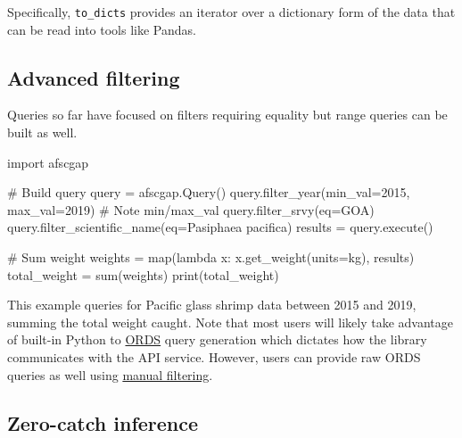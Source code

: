 \documentclass[
  letterpaper,
  oneside,
  open=any]{scrbook}
\newenvironment{Shaded}{\begin{snugshade}}{\end{snugshade}}
\newcommand{\AttributeTok}[1]{\textcolor[rgb]{0.40,0.45,0.13}{#1}}
\newcommand{\CommentTok}[1]{\textcolor[rgb]{0.37,0.37,0.37}{#1}}
\newcommand{\DecValTok}[1]{\textcolor[rgb]{0.68,0.00,0.00}{#1}}
\newcommand{\FunctionTok}[1]{\textcolor[rgb]{0.28,0.35,0.67}{#1}}
\newcommand{\NormalTok}[1]{\textcolor[rgb]{0.00,0.23,0.31}{#1}}
\newcommand{\OtherTok}[1]{\textcolor[rgb]{0.00,0.23,0.31}{#1}}
\newcommand{\SpecialCharTok}[1]{\textcolor[rgb]{0.37,0.37,0.37}{#1}}
\newcommand{\StringTok}[1]{\textcolor[rgb]{0.13,0.47,0.30}{#1}}
\begin{document}
Specifically, \texttt{to\_dicts} provides an iterator over a dictionary
form of the data that can be read into tools like Pandas.

\hypertarget{advanced-filtering}{%
\subsection{Advanced filtering}\label{advanced-filtering}}

Queries so far have focused on filters requiring equality but range
queries can be built as well.

\begin{Shaded}
\begin{Highlighting}[]
\NormalTok{import afscgap}

\CommentTok{\# Build query}
\NormalTok{query }\OtherTok{=} \FunctionTok{afscgap.Query}\NormalTok{()}
\FunctionTok{query.filter\_year}\NormalTok{(}\AttributeTok{min\_val=}\DecValTok{2015}\NormalTok{, }\AttributeTok{max\_val=}\DecValTok{2019}\NormalTok{)   }\CommentTok{\# Note min/max\_val}
\FunctionTok{query.filter\_srvy}\NormalTok{(}\AttributeTok{eq=}\StringTok{\textquotesingle{}GOA\textquotesingle{}}\NormalTok{)}
\FunctionTok{query.filter\_scientific\_name}\NormalTok{(}\AttributeTok{eq=}\StringTok{\textquotesingle{}Pasiphaea pacifica\textquotesingle{}}\NormalTok{)}
\NormalTok{results }\OtherTok{=} \FunctionTok{query.execute}\NormalTok{()}

\CommentTok{\# Sum weight}
\NormalTok{weights }\OtherTok{=} \FunctionTok{map}\NormalTok{(lambda x}\SpecialCharTok{:} \FunctionTok{x.get\_weight}\NormalTok{(}\AttributeTok{units=}\StringTok{\textquotesingle{}kg\textquotesingle{}}\NormalTok{), results)}
\NormalTok{total\_weight }\OtherTok{=} \FunctionTok{sum}\NormalTok{(weights)}
\FunctionTok{print}\NormalTok{(total\_weight)}
\end{Highlighting}
\end{Shaded}

This example queries for Pacific glass shrimp data between 2015 and
2019, summing the total weight caught. Note that most users will likely
take advantage of built-in Python to
\href{https://www.oracle.com/database/technologies/appdev/rest.html}{ORDS}
query generation which dictates how the library communicates with the
API service. However, users can provide raw ORDS queries as well using
\href{https://pyafscgap.org/devdocs/afscgap.html\#manual-filtering}{manual
filtering}.

\hypertarget{zero-catch-inference}{%
\subsection{Zero-catch inference}\label{zero-catch-inference}}
\end{document}
